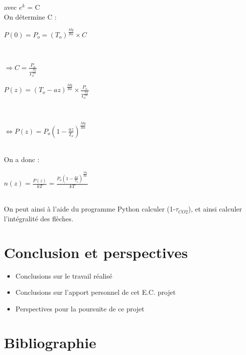 \documentclass[a4paper, 12pt]{report} %
\begin{document}
avec $e^{k}$ = C\\

 On détermine C :
\begin{center}
$P(0)= P_o = (T_o)^{\frac{Mg}{Ra}} \times C$\\
\end{center}\\

\begin{center}
$\Rightarrow C= \frac{P_o}{T_o^{\frac{Mg}{Ra}}}$
\end{center}

\begin{center}
$P(z) = (T_o -az)^{\frac{Mg}{Ra}} \times \frac{P_o}{T_o^{\frac{Mg}{Ra}}}$
\end{center}\\

\begin{center}
$\Leftrightarrow P(z)= P_o (1-\frac{az}{T_o})^{\frac{Mg}{Ra}}$
\end{center}\\

On a donc :
\begin{center}
   $n(z)=\frac{P(z)}{kT}= \frac{ P_o (1-\frac{az}{T_o})^{\frac{Mg}{Ra}}}{kT}$
\end{center}\\
On peut ainsi à l'aide du programme Python calculer (1-$\tau_{CO2}$), et ainsi calculer l'intégralité des flèches.

\chapter*{Conclusion et perspectives}
\begin{itemize}
\item Conclusions sur le travail réalisé
\item Conclusions sur l'apport personnel de cet E.C. projet
\item Perspectives pour la poursuite de ce projet
\end{itemize}


\newpage

\renewcommand{\notesname}{} %
\chapter*{Bibliographie}
\makeatletter
\renewcommand{\enoteheading}{\par\vspace{1 em}}
\renewcommand{\theenmark}{\makebox[0.5 em][r]{\@theenmark}}
\renewcommand{\enoteformat}{\parindent = 2 em
  							\leftskip = 0.5 em
  							[\theenmark]\enspace\ignorespaces}							
\makeatother
\theendnotes
\end{document}

